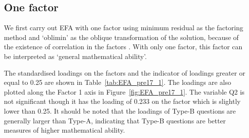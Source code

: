 \documentclass[a4paper]{report}
\begin{document}
\subsection{One factor}

We first carry out EFA with one factor using minimum residual as the factoring method and `oblimin' as the oblique transformation of the solution, because of the existence of correlation in the factors \cite{web:efa}. With only one factor, this factor can be interpreted as `general mathematical ability'. 

The standardised loadings on the factors and the indicator of loadings greater or equal to 0.25 are shown in Table~\ref{tab:EFA_pre17_1}. The loadings are also plotted along the Factor 1 axis in Figure~\ref{fig:EFA_pre17_1}. The variable Q2 is not significant though it has the loading of 0.233 on the factor which is slightly lower than 0.25. It should be noted that the loadings of Type-B questions are generally larger than Type-A, indicating that Type-B questions are better measures of higher mathematical ability. 
\end{document}
